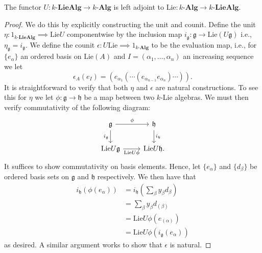 \begin{proposition}
  \label{prop:adjointu}
  The functor $  U:k\text{-}\mathbf{LieAlg} \to k\text{-}\mathbf{Alg}  $ is left adjoint to $ \text{Lie}:k\text{-}\mathbf{Alg} \to k\text{-}\mathbf{LieAlg} $.
\end{proposition}
\begin{proof}
  We do this by explicitly constructing the unit and counit. Define the unit $ \eta: 1_{k\text{-}\mathbf{LieAlg}} \implies \text{Lie}U $ componentwise by the inclusion map $ i_\mathfrak{g}: \mathfrak{g} \to \text{Lie}(U\mathfrak{g}) $
  i.e., $\eta_\mathfrak{g} = i_\mathfrak{g}$.
  We define the counit $ \epsilon: U\text{Lie} \implies 1_{k\text{-}\mathbf{Alg}} $ to be the evaluation map, i.e., for $ \{e_{\alpha}\} $ an ordered basis on $ \text{Lie}(A) $ and $ I = (\alpha_1, \ldots, \alpha_n) $ an increasing sequence we let
  \begin{equation}
    \epsilon_A(e_I) = (e_{\alpha_1}(\cdots (e_{\alpha_{n-1}}e_{\alpha_n})\cdots)).
  \end{equation}
  It is straightforward to verify that both $ \eta $ and $ \epsilon $ are natural constructions. To see this for $ \eta $ we let $ \phi:\mathfrak{g} \to \mathfrak{h} $ be a map between two $ k $-Lie algebras. We must then verify commutativity of the following diagram:
  \[\begin{tikzcd}
	  {\mathfrak{g}} & {\mathfrak{h}} \\
	  {\text{Lie}U\mathfrak{g}} & {\text{Lie}U\mathfrak{h}.}
	  \arrow["\phi", from=1-1, to=1-2]
	  \arrow["{\text{Lie}U\phi}"', from=2-1, to=2-2]
	  \arrow["{i_\mathfrak{g}}"', from=1-1, to=2-1]
	  \arrow["{i_\mathfrak{h}}", from=1-2, to=2-2]
  \end{tikzcd}\]
  It suffices to show commutativity on basis elements. Hence, let $ \{e_\alpha\} $ and $ \{d_\beta\} $ be ordered basis sets on $ \mathfrak{g} $ and $ \mathfrak{h} $ respectively. We then have that
  \begin{align*}
    i_\mathfrak{h}(\phi(e_\alpha)) &=i_\mathfrak{h}\left( \sum_{\beta} y_\beta d_\beta \right) \\
                                   &= \sum_{\beta} y_\beta d_{(\beta)} \\
                                   &= \text{Lie}U\phi \left( e_{(\alpha)} \right) \\
                                   &= \text{Lie}U\phi(i_\mathfrak{g}(e_\alpha))
  \end{align*}
  as desired. A similar argument works to show that $ \epsilon $ is natural.


\end{proof}
